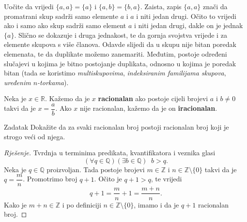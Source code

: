\begin{remark}
Uočite da vrijedi \(\{a, a\}=\{a\}\) i \(\{a, b\}=\{b, a\}\). Zaista, zapis \(\{a, a\}\) znači da promatrani skup sadrži samo elemente \(a\) i \(a\) i niti jedan drugi. Očito to vrijedi ako i samo ako skup sadrži samo element \(a\) i niti jedan drugi, dakle on je jednak \(\{a\}\). Slično se dokazuje i druga jednakost, te da gornja svojstva vrijede i za elemente skupova s više članova. Odavde slijedi da u skupu nije bitan poredak elemenata, te da duplikate možemo zanemariti. Međutim, postoje određeni slučajevi u kojima je bitno postojanje duplikata, odnosno u kojima je poredak bitan (tada se koristimo \textit{multiskupovima}, \textit{indeksiranim familijama skupova}, \textit{uređenim \(n\)-torkama}).
\end{remark}
\begin{definition}
Neka je \(x\in \mathbb{R}\). Kažemo da je \(x\) \textbf{racionalan} ako postoje cijeli brojevi \(a\) i \(b\neq 0\) takvi da je \(x=\dfrac{a}{b}\). Ako \(x\) nije racionalan, kažemo da je on \textbf{iracionalan}.
\end{definition}
\begin{exercise}{Zadatak}
Dokažite da za svaki racionalan broj postoji racionalan broj koji je strogo veći od njega.
\end{exercise}
\begin{proof}[Rješenje]
Tvrdnja u terminima predikata, kvantifikatora i veznika glasi
\[(\forall q\in \mathbb{Q})(\exists b\in \mathbb{Q})\;\; b>q.\]
Neka je \(q\in \mathbb{Q}\) proizvoljan. Tada postoje brojevi \(m\in \mathbb{Z}\) i \(n\in \mathbb{Z}\setminus\{0\}\) takvi da je \(q=\dfrac{m}{n}\). Promotrimo broj \(q+1\). Očito je \(q+1>q\), te vrijedi
\[q+1=\dfrac{m}{n}+1=\dfrac{m+n}{n}.\]
Kako je \(m+n\in \mathbb{Z}\) i po definiciji \(n\in \mathbb{Z}\setminus\{0\}\), imamo i da je \(q+1\) racionalan broj.
\end{proof}
